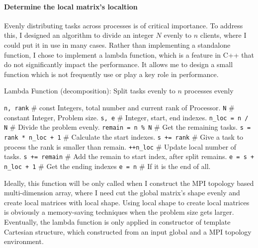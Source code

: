 \paragraph{Determine the local matrix's localtion}
Evenly distributing tasks across processes is of critical importance.
To address this, I designed an algorithm to divide an integer $N$ evenly to $n$ clients, where I could put it in use in 
many cases.
Rather than implementing a standalone function, I chose to implement a lambda function, which is a feature in C++ that do not significantly 
impact the performance.
It allows me to design a small function which is not frequently use or play a key role in performance.
\begin{algorithm}
  \caption{Lambda Function (decomposition): Split tasks evenly to $n$ processes evenly}
  \label{ALG:Determine_Start_End_Decomp}
  \begin{algorithmic}[1]
    \STATE \texttt{n, rank} \hfill \# const Integers, total number and current rank of Processor.
    \STATE \texttt{N} \hfill \# constant Integer, Problem size.
    \STATE \texttt{s, e} \hfill \# Integer, start, end indexes.
    \STATE \texttt{n\_loc = n / N} \hfill \# Divide the problem evenly.
    \STATE \texttt{remain = n \% N} \hfill \# Get the remaining tasks.
    \STATE \texttt{s = rank * n\_loc + 1} \hfill \# Calculate the start indexes.
      \STATE \texttt{s += rank}      \hfill \# Give a task to process the rank is smaller than remain.
      \STATE \texttt{++n\_loc}       \hfill \# Update local number of tasks.
    \ELSE 
      \STATE \texttt{s += remain}   \hfill \# Add the remain to start index, after split remains.
    \ENDIF
    \STATE \texttt{e = s + n\_loc + 1}  \hfill \# Get the ending indexes
      \STATE \texttt{e = n}           \hfill \# If it is the end of all.
    \ENDIF
  \end{algorithmic}
\end{algorithm}
Ideally, this function will be only called when I construct the MPI topology based multi-dimension array, where I 
need cut the global matrix's shape evenly and create local matrices with local shape.
Using local shape to create local matrices is obviously a memory-saving techniques when the problem size gets larger.
Eventually, the lambda function is only applied in constructor of template Cartesian structure, which constructed from 
an input global and a MPI topology environment. 

